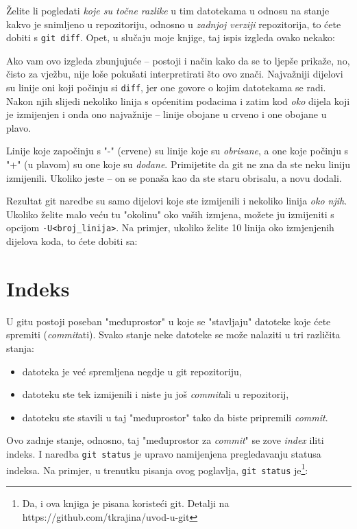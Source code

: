 Želite li pogledati \emph{koje su točne razlike} u tim datotekama u odnosu na stanje kakvo je snimljeno u repozitoriju, odnosno u \emph{zadnjoj verziji} repozitorija, to ćete dobiti s \verb+git diff+. 
Opet, u slučaju moje knjige, taj ispis izgleda ovako nekako:



Ako vam ovo izgleda zbunjujuće -- postoji i način kako da se to ljepše prikaže, no, čisto za vježbu, nije loše pokušati interpretirati što ovo znači.
Najvažniji dijelovi su linije oni koji počinju si \verb+diff+, jer one govore o kojim datotekama se radi.
Nakon njih slijedi nekoliko linija s općenitim podacima i zatim kod \emph{oko} dijela koji je izmijenjen i onda ono najvažnije -- linije obojane u crveno i one obojane u plavo.

Linije koje započinju s "-" (crvene) su linije koje su \emph{obrisane}, a one koje počinju s "+" (u plavom) su one koje su \emph{dodane}. 
Primijetite da git ne zna da ste neku liniju izmijenili. 
Ukoliko jeste -- on se ponaša kao da ste staru obrisalu, a novu dodali.

Rezultat git naredbe su samo dijelovi koje ste izmijenili i nekoliko linija \emph{oko njih}.
Ukoliko želite malo veću tu "okolinu" oko vaših izmjena, možete ju izmijeniti s opcijom \verb+-U<broj_linija>+.
Na primjer, ukoliko želite 10 linija oko izmjenjenih dijelova koda, to ćete dobiti sa:


\section*{Indeks}

U gitu postoji poseban "međuprostor" u koje se "stavljaju" datoteke koje ćete spremiti (\emph{commit}ati).
Svako stanje neke datoteke se može nalaziti u tri različita stanja:

\begin{itemize}
	\item datoteka je već spremljena negdje u git repozitoriju,
	\item datoteku ste tek izmijenili i niste ju još \emph{commit}ali u repozitorij,
	\item datoteku ste stavili u taj "međuprostor" tako da biste pripremili \emph{commit}.
\end{itemize}

Ovo zadnje stanje, odnosno, taj "međuprostor za \emph{commit}" se zove \emph{index} iliti indeks.
I naredba \verb+git status+ je upravo namijenjena pregledavanju statusa indeksa.
Na primjer, u trenutku pisanja ovog poglavlja, \verb+git status+ je\footnote{Da, i ova knjiga je pisana koristeći git. Detalji na https://github.com/tkrajina/uvod-u-git}:

